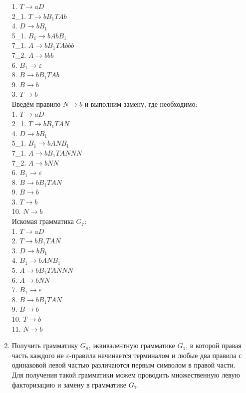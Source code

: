 \documentclass[a4paper,14pt]{extarticle}
\begin{document}
\begin{enumerate}[1.]
1. $T \rightarrow aD$\\
2\_1. $T \rightarrow bB_1TAb$\\
4. $D \rightarrow bB_1$\\
5\_1. $B_1 \rightarrow bAbB_1$\\
7\_1. $A \rightarrow bB_1TAbbb$\\
7\_2. $A \rightarrow bbb$\\
6. $B_1 \rightarrow \varepsilon$\\
8. $B \rightarrow bB_1TAb$\\
9. $B \rightarrow b$\\
3. $T \rightarrow b$\\

Введём правило $N \rightarrow b$ и выполним замену, где необходимо:\\
1. $T \rightarrow aD$\\
2\_1. $T \rightarrow bB_1TAN$\\
4. $D \rightarrow bB_1$\\
5\_1. $B_1 \rightarrow bANB_1$\\
7\_1. $A \rightarrow bB_1TANNN$\\
7\_2. $A \rightarrow bNN$\\
6. $B_1 \rightarrow \varepsilon$\\
8. $B \rightarrow bB_1TAN$\\
9. $B \rightarrow b$\\
3. $T \rightarrow b$\\
10. $N \rightarrow b$\\

Искомая грамматика $G_7$:\\
1. $T \rightarrow aD$\\
2. $T \rightarrow bB_1TAN$\\
3. $D \rightarrow bB_1$\\
4. $B_1 \rightarrow bANB_1$\\
5. $A \rightarrow bB_1TANNN$\\
6. $A \rightarrow bNN$\\
7. $B_1 \rightarrow \varepsilon$\\
8. $B \rightarrow bB_1TAN$\\
9. $B \rightarrow b$\\
10. $T \rightarrow b$\\
11. $N \rightarrow b$\\

\item Получить грамматику $G_8$, эквивалентную грамматике $G_1$, в которой 
правая часть каждого не $\varepsilon$-правила начинается терминалом и любые
два правила с одинаковой левой частью различаются первым символом в правой части.\\
Для получения такой грамматики можем проводить множественную левую факторизацию и замену в грамматике $G_7$.\\


\end{enumerate}
\end{document}

